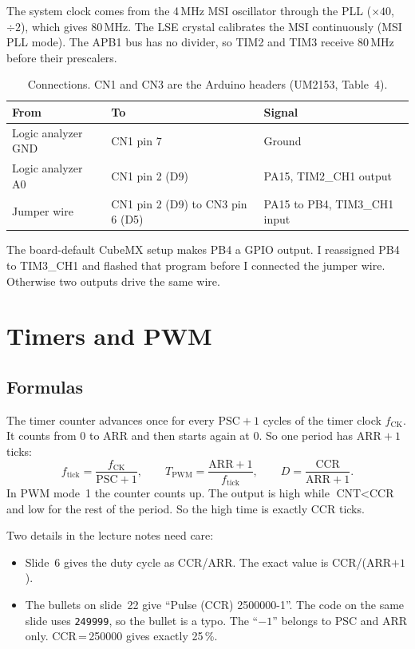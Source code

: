 \documentclass[11pt,a4paper]{article}
\begin{document}
The system clock comes from the 4\,MHz MSI oscillator through the PLL
($\times 40$, $\div 2$), which gives 80\,MHz. The LSE crystal calibrates the
MSI continuously (MSI PLL mode). The APB1 bus has no divider, so TIM2 and TIM3
receive 80\,MHz before their prescalers.

\begin{table}[h]
\centering
\caption{Connections. CN1 and CN3 are the Arduino headers (UM2153, Table~4).}
\begin{tabular}{@{}lll@{}}
\toprule
From & To & Signal \\
\midrule
Logic analyzer GND & CN1 pin 7 & Ground \\
Logic analyzer A0  & CN1 pin 2 (D9) & PA15, TIM2\_CH1 output \\
Jumper wire        & CN1 pin 2 (D9) to CN3 pin 6 (D5) & PA15 to PB4, TIM3\_CH1 input \\
\bottomrule
\end{tabular}
\end{table}

The board-default CubeMX setup makes PB4 a GPIO output. I reassigned PB4 to
TIM3\_CH1 and flashed that program before I connected the jumper wire.
Otherwise two outputs drive the same wire.

\section{Timers and PWM}

\subsection{Formulas}

The timer counter advances once for every $\text{PSC}+1$ cycles of the timer
clock $f_\text{CK}$. It counts from 0 to ARR and then starts again at 0. So
one period has $\text{ARR}+1$ ticks:
\begin{equation}
  f_\text{tick} = \frac{f_\text{CK}}{\text{PSC}+1}, \qquad
  T_\text{PWM}  = \frac{\text{ARR}+1}{f_\text{tick}}, \qquad
  D = \frac{\text{CCR}}{\text{ARR}+1}.
\end{equation}
In PWM mode~1 the counter counts up. The output is high while
$\text{CNT} < \text{CCR}$ and low for the rest of the period. So the high time
is exactly CCR ticks.

Two details in the lecture notes need care:
\begin{itemize}
  \item Slide~6 gives the duty cycle as CCR/ARR. The exact value is
        CCR/(ARR$+1$).
  \item The bullets on slide~22 give ``Pulse (CCR) 2500000-1''. The code on
        the same slide uses \texttt{249999}, so the bullet is a typo. The
        ``$-1$'' belongs to PSC and ARR only. CCR\,=\,250000 gives exactly
        25\,\%.
\end{itemize}
\end{document}
